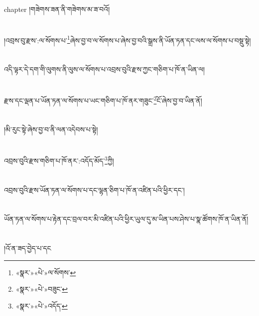 chapter{ }།གཟེགས་ཟན་ནི་གཟེགས་མ་ཟ་བའོ།\chapter{ }།འབྲས་བུ་རྫས་:ལ་སོགས་པ་\footnote{«སྣར་»«པེ་»ལ་སོགས་}ཞེས་བྱ་བ་ལ་སོགས་པ་ཞེས་བྱ་བའི་སྒྲས་ནི་ཡོན་ཏན་དང་ལས་ལ་སོགས་པ་བསྡུ་སྟེ།\chapter{ }འདི་ལྟར་དེ་དག་གི་ལུགས་ནི་ལུས་ལ་སོགས་པ་འབྲས་བུའི་རྫས་ཀྱང་གཅིག་པ་ཁོ་ན་ཡིན་ལ།\chapter{ }རྫས་དང་ལྡན་པ་ཡོན་ཏན་ལ་སོགས་པ་ཡང་གཅིག་པ་ཁོ་ནར་གཟུང་\footnote{«སྣར་»«པེ་»བཟུང་}ངོ་ཞེས་བྱ་བ་ཡིན་ནོ།\chapter{ }།མི་རུང་སྟེ་ཞེས་བྱ་བ་ནི་ལན་འདེབས་པ་སྟེ།\chapter{ }འབྲས་བུའི་རྫས་གཅིག་པ་ཁོ་ནར་:འདོད་མོད་\footnote{«སྣར་»«པེ་»འདོད་}ཀྱི།\chapter{ }འབྲས་བུའི་རྫས་ཡོན་ཏན་ལ་སོགས་པ་དང་ལྷན་ཅིག་པ་ཁོ་ན་འཛིན་པའི་ཕྱིར་དང་།\chapter{ }ཡོན་ཏན་ལ་སོགས་པ་རྟེན་དང་བྲལ་བར་མི་འཛིན་པའི་ཕྱིར་ཡུལ་དུ་མ་ཡིན་པས་ཤེས་པ་སྣ་ཚོགས་ཁོ་ན་ཡིན་ནོ།\chapter{ }།འོ་ན་ཟད་བྱེད་པ་དང